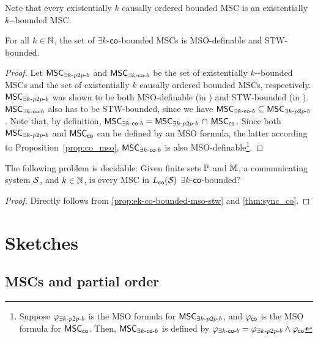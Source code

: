 \documentclass{article}
\begin{document}
Note that every existentially $k$ causally ordered bounded MSC is an existentially $k$-\pp-bounded MSC.

\begin{proposition}\label{prop:ek-co-bounded-mso-stw}
For all $k \in \mathbb{N}$, the set of $\exists k$-$\mathsf{co}$-bounded MSCs is MSO-definable and STW-bounded.
\end{proposition}
\begin{proof}
Let $\mathsf{MSC}_{\exists k\text{-}p2p\text{-}b}$ and $\mathsf{MSC}_{\exists k\text{-}\mathsf{co}\text{-}b}$ be the set of existentially $k$-\pp-bounded MSCs and the set of existentially $k$ causally ordered bounded MSCs, respectively. $\mathsf{MSC}_{\exists k\text{-}p2p\text{-}b}$ was shown to be both MSO-definable (in \cite{DBLP:journals/iandc/LohreyM04}) and STW-bounded (in \cite[Proposition 5.4, page 163]{DBLP:journals/corr/abs-1904-06942}). $\mathsf{MSC}_{\exists k\text{-}\mathsf{co}\text{-}b}$ also has to be STW-bounded, since we have $\mathsf{MSC}_{\exists k\text{-}\mathsf{co}\text{-}b} \subseteq \mathsf{MSC}_{\exists k\text{-}p2p\text{-}b}$. Note that, by definition, $\mathsf{MSC}_{\exists k\text{-}\mathsf{co}\text{-}b} = \mathsf{MSC}_{\exists k\text{-}p2p\text{-}b}\, \cap\, \mathsf{MSC}_{\mathsf{co}}$. Since both $\mathsf{MSC}_{\exists k\text{-}p2p\text{-}b}$ and $\mathsf{MSC}_{\mathsf{co}}$ can be defined by an MSO formula, the latter according to Proposition~\ref{prop:co_mso}, $\mathsf{MSC}_{\exists k\text{-}\mathsf{co}\text{-}b}$ is also MSO-definable\footnote{Suppose $\varphi_{\exists k\text{-}p2p\text{-}b}$ is the MSO formula for $\mathsf{MSC}_{\exists k\text{-}p2p\text{-}b}$, and $\varphi_{\mathsf{co}}$ is the MSO formula for $\mathsf{MSC}_{\mathsf{co}}$. Then, $\mathsf{MSC}_{\exists k\text{-}\mathsf{co}\text{-}b}$ is defined by $\varphi_{\exists k\text{-}\mathsf{co}\text{-}b} = \varphi_{\exists k\text{-}p2p\text{-}b} \wedge \varphi_{\mathsf{co}}$}.
\end{proof}

\begin{theorem}\label{thm:sync_ek_co_bounded}
	The following problem is decidable: Given finite sets $\mathbb{P}$ and $\mathbb{M}$, a communicating system $\mathcal{S}$, and $k \in \mathbb{N}$, is every MSC in $L_{\mathsf{co}}(\mathcal{S})$ $\exists k$-$\mathsf{co}$-bounded?
\end{theorem}
\begin{proof}
	Directly follows from \ref{prop:ek-co-bounded-mso-stw} and \ref{thm:sync_co}.
\end{proof}

\section{Sketches}

\subsection{MSCs and partial order}

\end{document}
